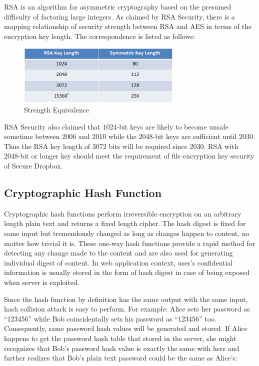 RSA is an algorithm for asymmetric cryptography based on the presumed difficulty of factoring large integers. As claimed by RSA Security, there is a mapping relationship of security strength between RSA and AES in terms of the encryption key length. The correspondence is listed as follows:

\begin{figure}[h]
        \centering
        \includegraphics[width=0.7\textwidth]{figures/Strength_Equivalence.png}
        \caption[Strength Equivalence] {Strength Equivalence\cite{Kaliski2009}\cite{Publication2007}}
\end{figure}

RSA Security also claimed that 1024-bit keys are likely to become unsafe sometime between 2006 and 2010 while the 2048-bit keys are sufficient until 2030. Thus the RSA key length of 3072 bits will be required since 2030\cite{Kaliski2009}. RSA with 2048-bit or longer key should meet the requirement of file encryption key security of Secure Dropbox.

\subsection{Cryptographic Hash Function}

Cryptographic hash functions perform irreversible encryption on an arbitrary length plain text and returns a fixed length cipher. The hash digest is fixed for same input but tremendously changed as long as changes happen to content, no matter how trivial it is\cite{Merkle1990}. These one-way hash functions provide a rapid method for detecting any change made to the content and are also used for generating individual digest of content\cite{Merkle1990}. In web application context, user’s confidential information is usually stored in the form of hash digest in case of being exposed when server is exploited.

Since the hash function by definition has the same output with the same input, hash collision attack is easy to perform. For example: Alice sets her password as ``123456'' while Bob coincidentally sets his password as ``123456'' too. Consequently, same password hash values will be generated and stored. If Alice happens to get the password hash table that stored in the server, she might recognizes that Bob’s password hash value is exactly the same with hers and further realizes that Bob’s plain text password could be the same as Alice’s:

